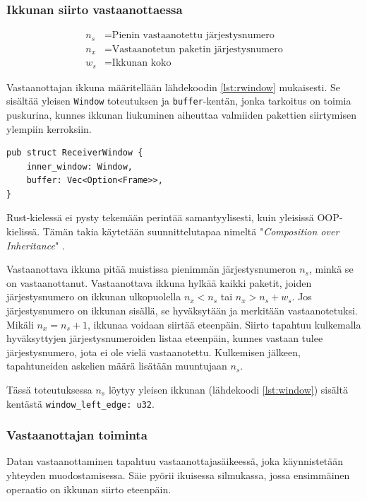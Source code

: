 \documentclass[a4paper,12pt]{article}
\begin{document}
    \subsubsection{Ikkunan siirto vastaanottaessa}

    \begin{align}
        n_s &= \text{Pienin vastaanotettu järjestysnumero} \\
        n_x &= \text{Vastaanotetun paketin järjestysnumero} \\
        w_s &= \text{Ikkunan koko}
    \end{align}



    Vastaanottajan ikkuna määritellään lähdekoodin \ref{lst:rwindow} mukaisesti. Se sisältää yleisen \lstinline{Window} toteutuksen ja \lstinline{buffer}-kentän, jonka tarkoitus on toimia puskurina, kunnes ikkunan liukuminen aiheuttaa valmiiden pakettien siirtymisen ylempiin kerroksiin. \par
    
\begin{lstlisting}[caption={Vastaanottajan ikkunan rakenne}, label={lst:rwindow}]
pub struct ReceiverWindow {
    inner_window: Window,
    buffer: Vec<Option<Frame>>,
}\end{lstlisting}

    Rust-kielessä ei pysty tekemään perintää samantyylisesti, kuin yleisissä OOP-kielissä. Tämän takia
    käytetään suunnittelutapaa nimeltä "\textit{Composition over Inheritance}" \cite{Ivicevic202228Inheritance}.

    Vastaanottava ikkuna pitää muistissa pienimmän järjestysnumeron $n_s$, minkä se on vastaanottanut.
    Vastaanottava ikkuna hylkää kaikki paketit, joiden järjestysnumero on ikkunan ulkopuolella $n_x < n_s$ tai $n_x > n_s + w_s$. Jos järjestysnumero on ikkunan sisällä, se hyväksytään ja merkitään vastaanotetuksi. Mikäli $n_x = n_s + 1$, ikkunaa voidaan siirtää eteenpäin.
    Siirto tapahtuu kulkemalla hyväksyttyjen järjestysnumeroiden listaa eteenpäin, kunnes vastaan tulee järjestysnumero, jota ei ole vielä vastaanotettu. Kulkemisen jälkeen, tapahtuneiden askelien määrä lisätään muuntujaan $n_s$.

    Tässä toteutuksessa $n_s$ löytyy yleisen ikkunan (lähdekoodi \ref{lst:window}) sisältä kentästä \lstinline{window_left_edge: u32}.


    \subsubsection{Vastaanottajan toiminta}
    Datan vastaanottaminen tapahtuu vastaanottajasäikeessä, joka käynnistetään yhteyden muodostamisessa.
    Säie pyörii ikuisessa silmukassa, jossa ensimmäinen operaatio on ikkunan siirto eteenpäin.
\end{document}
